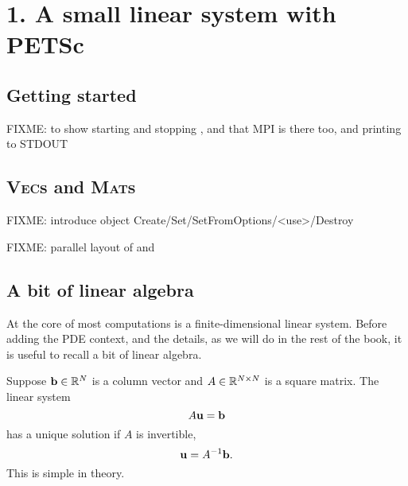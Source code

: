 
\chapter{1. A small linear system with PETSc}

\section{Getting started}

FIXME: to show starting and stopping \PETSc, and that MPI is there too, and printing to STDOUT


\section{\textsc{Vec}s and \textsc{Mat}s} 

FIXME: introduce object Create/Set/SetFromOptions/<use>/Destroy

FIXME: parallel layout of \pVec and \pMat

\section{A bit of linear algebra}

At the core of most \PETSc computations is a finite-dimensional linear system.  Before adding the PDE context, and the \PETSc details, as we will do in the rest of the book, it is useful to recall a bit of linear algebra.

Suppose $\mathbf{b}\in \mathbb{R}^{N}$ is a column vector and $A\in\mathbb{R}^{N\times N}$ is a square matrix.  The linear system
\begin{equation}
A \mathbf{u} = \mathbf{b} \label{introsystem}
\end{equation}
has a unique solution if $A$ is invertible,
\begin{equation}
\mathbf{u} = A^{-1} \mathbf{b}. \label{introsolution}
\end{equation}
This is simple in theory.

